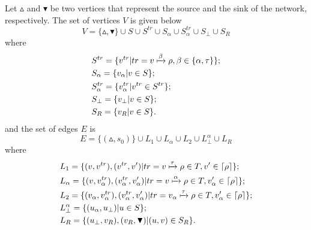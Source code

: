 \documentclass[a4paper,runningheads]{llncs}
\begin{document}
Let $\vartriangle$ and $\blacktriangledown$ be two vertices that represent the source and the sink of the network, respectively. The set of vertices $V$ is given below
\[V=\{\vartriangle,\blacktriangledown\}\cup S\cup S^{tr}\cup S_{\alpha}\cup S_{\alpha}^{tr}\cup S_{\bot}\cup S_{R}\] where
\begin{equation*}
    \begin{aligned}
    & S^{tr}=\{v^{tr}|tr=v \xmapsto{\beta} \rho ,\beta\in\{\alpha,\tau\}\};\\
    & S_{\alpha}=\{v_{\alpha}|v\in S\};\\
    & S_{\alpha}^{tr}=\{v_{\alpha}^{tr}|v^{tr}\in S^{tr}\};\\
    & S_{\bot}=\{v_{\bot}|v\in S\};\\
    & S_{R}=\{v_{R}|v\in S\}.
    \end{aligned}
\end{equation*}
and the set of edges $E$ is
\[E=\{(\vartriangle,s_{0})\}\cup L_{1}\cup L_{\alpha}\cup L_{2}\cup L_{\bot}^{\alpha}\cup L_{R}\] where
\begin{equation*}
    \begin{aligned}
    & L_{1}=\{(v,v^{tr}),(v^{tr},v')|tr=v\xmapsto{\tau}\rho\in T,v'\in\lceil\rho\rceil\};\\
    & L_{\alpha}=\{(v,v_{\alpha}^{tr}),(v_{\alpha}^{tr},v'_{\alpha})|tr=v\xmapsto{\alpha}\rho\in T,v'_{\alpha}\in\lceil\rho\rceil\};\\
    & L_{2}=\{(v_{\alpha},v_{\alpha}^{tr}),(v_{\alpha}^{tr},v'_{\alpha})|tr=v_{\alpha}\xmapsto{\tau}\rho\in T,v'_{\alpha}\in\lceil\rho\rceil\};\\
    & L_{\bot}^{\alpha}=\{(u_{
    \alpha},u_{\bot})|u\in S\};\\
    & L_{R}=\{(u_{\bot},v_{R}),(v_{R},\blacktriangledown)|(u,v)\in S_{R}\}.
    \end{aligned}
\end{equation*}
\end{document}
